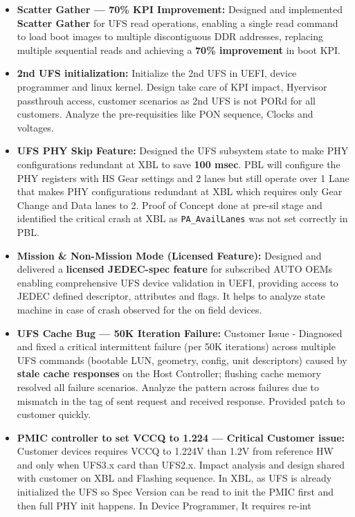 \documentclass[10pt, a4paper]{article}
\begin{document}
\begin{itemize}
  \item \textbf{Scatter Gather --- 70\% KPI Improvement:}
        Designed and implemented \textbf{Scatter Gather} for UFS read operations,
        enabling a single read command to load boot images to multiple discontiguous
        DDR addresses, replacing multiple sequential reads and achieving a
        \textbf{70\% improvement} in boot KPI.

  \item \textbf{2nd UFS initialization:}
        Initialize the 2nd UFS in UEFI, device programmer and linux kernel. Design take care of
		KPI impact, Hyervisor passthrouh access, customer scenarios as 2nd UFS is not PORd for all customers. Analyze the
		pre-requisities like PON sequence, Clocks and voltages.

  \item \textbf{UFS PHY Skip Feature:}
        Designed the UFS subsystem state to make PHY configurations redundant at XBL to save \textbf{100 msec}.
		PBL will configure the PHY registers with HS Gear settings and 2 lanes but still operate over
		1 Lane that makes PHY configurations redundant at XBL which requires only Gear Change and
		Data lanes to 2. Proof of Concept done at pre-sil stage and identified the critical crash at XBL as 
		\texttt{PA\_AvailLanes} was not set correctly in PBL.


  \item \textbf{Mission \& Non-Mission Mode (Licensed Feature):}
        Designed and delivered a \textbf{licensed JEDEC-spec feature} for subscribed
        AUTO OEMs enabling comprehensive UFS device validation in UEFI, providing
		access to JEDEC defined descriptor, attributes and flags. It helps to analyze
		state machine in case of crash observed for the on field devices.

  \item \textbf{UFS Cache Bug --- 50K Iteration Failure:}
        Customer Issue - Diagnosed and fixed a critical intermittent failure (per 50K iterations)
        across multiple UFS commands (bootable LUN, geometry, config, unit
        descriptors) caused by \textbf{stale cache responses} on the Host
        Controller; flushing cache memory resolved all failure scenarios. Analyze the
		pattern across failures due to mismatch in the tag of sent request 
		and received response. Provided patch to customer quickly.

  \item \textbf{PMIC controller to set VCCQ to 1.224 --- Critical Customer issue:}
		Customer devices requires VCCQ to 1.224V than 1.2V from reference HW and only when UFS3.x
		card than UFS2.x. Impact analysis and design shared with customer on XBL and Flashing sequence.
		In XBL, as UFS is already initialized the UFS so Spec Version can be read to init the PMIC first and then full PHY init
		happens. In Device Programmer, It requires re-int


\end{itemize}
\end{document}
